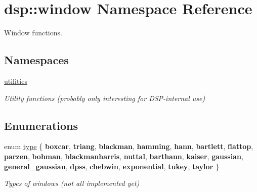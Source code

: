 \hypertarget{namespacedsp_1_1window}{}\section{dsp\+:\+:window Namespace Reference}
\label{namespacedsp_1_1window}


Window functions.  


\subsection*{Namespaces}
\begin{DoxyCompactItemize}
\item 
 \mbox{\hyperlink{namespacedsp_1_1window_1_1utilities}{utilities}}
\begin{DoxyCompactList}\small\item\em Utility functions (probably only interesting for D\+S\+P-\/internal use) \end{DoxyCompactList}\end{DoxyCompactItemize}
\subsection*{Enumerations}
\begin{DoxyCompactItemize}
\item 
\mbox{\label{namespacedsp_1_1window_a1cc0dcec4aa9e12640771bdf41f695b8}} 
enum \mbox{\hyperlink{namespacedsp_1_1window_a1cc0dcec4aa9e12640771bdf41f695b8}{type}} \{ \newline
{\bfseries boxcar}, 
{\bfseries triang}, 
{\bfseries blackman}, 
{\bfseries hamming}, 
\newline
{\bfseries hann}, 
{\bfseries bartlett}, 
{\bfseries flattop}, 
{\bfseries parzen}, 
\newline
{\bfseries bohman}, 
{\bfseries blackmanharris}, 
{\bfseries nuttal}, 
{\bfseries barthann}, 
\newline
{\bfseries kaiser}, 
{\bfseries gaussian}, 
{\bfseries general\+\_\+gaussian}, 
{\bfseries dpss}, 
\newline
{\bfseries chebwin}, 
{\bfseries exponential}, 
{\bfseries tukey}, 
{\bfseries taylor}
 \}
\begin{DoxyCompactList}\small\item\em Types of windows (not all implemented yet) \end{DoxyCompactList}\end{DoxyCompactItemize}
